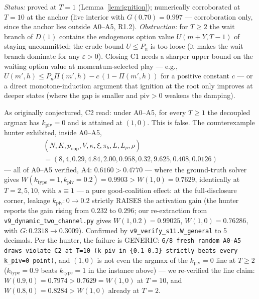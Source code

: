 \emph{Status:} proved at $T=1$ (Lemma~\ref{lem:ignition}); numerically corroborated at $T=10$
at the anchor (live interior with $G(0.70)=0.997$ --- corroboration only, since the anchor lies
outside A0--A5, R1.2). \emph{Obstruction:} for $T\ge 2$ the wait branch of $D(1)$ contains the
endogenous option value $U(m+Y,T-1)$ of staying uncommitted; the crude bound $U\le P_n$ is too
loose (it makes the wait branch dominate for any $\varepsilon>0$). Closing C1 needs a sharper
upper bound on the waiting option value at momentum-selected play --- e.g.,
$U(m',h)\le P_n\Pi(m',h)-c\,(1-\Pi(m',h))$ for a positive constant $c$ --- or a direct
monotone-induction argument that ignition at the root only improves at deeper states (where
the gap is smaller and $\mathrm{piv}>0$ weakens the damping).

\begin{remark}\label{rem:falsifiedC2}
As originally conjectured, C2 read: under A0--A5, for every $T\ge 1$ the decoupled argmax has
$k_{\mathrm{piv}}=0$ and is attained at $(1,0)$. This is false. The counterexample hunter
exhibited, inside A0--A5,
\begin{gather*}
(N,K,p_{\mathrm{opp}},V,\kappa,\xi,\pi_b,L,L_p,\rho)\\
=(8,4,0.29,4.84,2.00,0.958,0.32,9.625,0.408,0.0126)
\end{gather*}
--- all of A0--A5 verified, A4: $0.6160>0.4770$ --- where the ground-truth solver gives
$W(k_{\mathrm{type}}{=}1,k_{\mathrm{piv}}{=}0.2)=0.9903>W(1,0)=0.7629$, identically at
$T=2,5,10$, with $s\equiv 1$ --- a pure good-coalition effect: at the full-disclosure corner,
leakage $k_{\mathrm{piv}}\colon 0\to 0.2$ strictly RAISES the activation gain (the hunter
reports the gain rising from $0.232$ to $0.296$; our re-extraction from
\texttt{v9\_dynamic\_two\_channel.py} gives $W(1,0.2)=0.99025$, $W(1,0)=0.76286$, with
$G\colon 0.2318\to 0.3009$). Confirmed by \texttt{v9\_verify\_s11.W\_general} to 5 decimals.
Per the hunter, the failure is GENERIC: \texttt{6/8 fresh random A0-A5 draws violate C2 at
T=10 (k\_piv in \{0.1-0.3\} strictly beats every k\_piv=0 point)}, and $(1,0)$ is not even the
argmax of the $k_{\mathrm{piv}}=0$ line at $T\ge 2$ ($k_{\mathrm{type}}=0.9$ beats
$k_{\mathrm{type}}=1$ in the instance above) --- we re-verified the line claim:
$W(0.9,0)=0.7974>0.7629=W(1,0)$ at $T=10$, and $W(0.8,0)=0.8284>W(1,0)$ already at $T=2$.


\end{remark}
